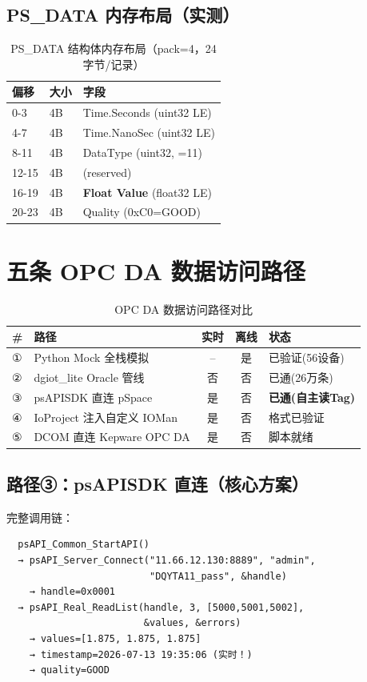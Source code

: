 \documentclass[12pt,a4paper]{ctexart}
\begin{document}
\subsection{PS\_DATA 内存布局（实测）}
\begin{table}[H]\centering
\caption{PS\_DATA 结构体内存布局（pack=4，24字节/记录）}
\begin{tabular}{lll}
\toprule
\textbf{偏移} & \textbf{大小} & \textbf{字段} \\
\midrule
0-3   & 4B & Time.Seconds (uint32 LE) \\
4-7   & 4B & Time.NanoSec (uint32 LE) \\
8-11  & 4B & DataType (uint32, =11) \\
12-15 & 4B & (reserved) \\
16-19 & 4B & \textbf{Float Value} (float32 LE) \\
20-23 & 4B & Quality (0xC0=GOOD) \\
\bottomrule
\end{tabular}
\end{table}

\section{五条 OPC DA 数据访问路径}

\begin{table}[H]\centering
\caption{OPC DA 数据访问路径对比}
\begin{tabular}{lp{3cm}ccp{2.5cm}}
\toprule
\textbf{\#} & \textbf{路径} & \textbf{实时} & \textbf{离线} & \textbf{状态} \\
\midrule
① & Python Mock 全栈模拟 & -- & 是 & 已验证(56设备) \\
② & dgiot\_lite Oracle 管线 & 否 & 否 & 已通(26万条) \\
③ & psAPISDK 直连 pSpace & 是 & 否 & \textbf{已通(自主读Tag)} \\
④ & IoProject 注入自定义 IOMan & 是 & 否 & 格式已验证 \\
⑤ & DCOM 直连 Kepware OPC DA & 是 & 否 & 脚本就绪 \\
\bottomrule
\end{tabular}
\end{table}

\subsection{路径③：psAPISDK 直连（核心方案）}
完整调用链：
\begin{verbatim}
  psAPI_Common_StartAPI()
  → psAPI_Server_Connect("11.66.12.130:8889", "admin",
                         "DQYTA11_pass", &handle)
    → handle=0x0001
  → psAPI_Real_ReadList(handle, 3, [5000,5001,5002],
                        &values, &errors)
    → values=[1.875, 1.875, 1.875]
    → timestamp=2026-07-13 19:35:06 (实时！)
    → quality=GOOD
\end{verbatim}
\end{document}
